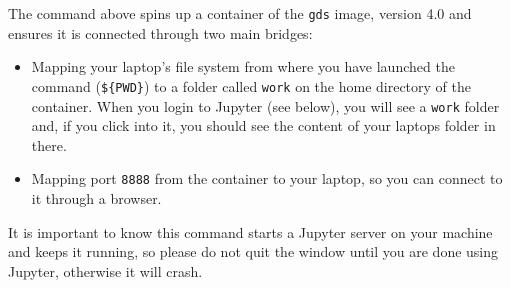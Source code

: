 \documentclass[
]{book}
\providecommand{\tightlist}{%
  \setlength{\itemsep}{0pt}\setlength{\parskip}{0pt}}
\begin{document}
The command above spins up a container of the \texttt{gds} image, version 4.0 and
ensures it is connected through two main bridges:

\begin{itemize}
\tightlist
\item
  Mapping your laptop's file system from where you have launched the
  command (\texttt{\$\{PWD\}}) to a folder called \texttt{work} on the home directory of
  the container. When you login to Jupyter (see below), you will see a
  \texttt{work} folder and, if you click into it, you should see the content of
  your laptops folder in there.
\item
  Mapping port \texttt{8888} from the container to your laptop, so you can
  connect to it through a browser.
\end{itemize}

It is important to know this command starts a Jupyter server on your machine and keeps it running, so please do not quit the window until you are
done using Jupyter, otherwise it will crash.
\end{document}

